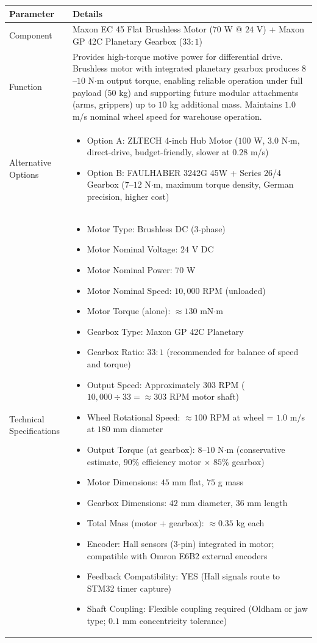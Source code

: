 \documentclass[12pt,a4paper]{article}
\begin{document}
\begin{longtable}{|p{4cm}|p{10cm}|}
\hline
\textbf{Parameter} & \textbf{Details} \\
\hline

Component &
Maxon EC 45 Flat Brushless Motor ($70$ W @ $24$ V) + Maxon GP 42C Planetary Gearbox ($33:1$) \\
\hline

Function &
Provides high-torque motive power for differential drive. Brushless motor with integrated planetary gearbox produces $8$--$10$ N$\cdot$m output torque, enabling reliable operation under full payload ($50$ kg) and supporting future modular attachments (arms, grippers) up to $10$ kg additional mass. Maintains $1.0$ m/s nominal wheel speed for warehouse operation. \\
\hline

Alternative Options &
\begin{itemize}
\item Option A: ZLTECH 4-inch Hub Motor ($100$ W, $3.0$ N$\cdot$m, direct-drive, budget-friendly, slower at $0.28$ m/s)
\item Option B: FAULHABER 3242G 45W + Series 26/4 Gearbox ($7$--$12$ N$\cdot$m, maximum torque density, German precision, higher cost)
\end{itemize}
\\
\hline

Technical Specifications &
\begin{itemize}
\item Motor Type: Brushless DC ($3$-phase)
\item Motor Nominal Voltage: $24$ V DC
\item Motor Nominal Power: $70$ W
\item Motor Nominal Speed: $10,000$ RPM (unloaded)
\item Motor Torque (alone): $\approx 130$ mN$\cdot$m
\item Gearbox Type: Maxon GP 42C Planetary
\item Gearbox Ratio: $33:1$ (recommended for balance of speed and torque)
\item Output Speed: Approximately $303$ RPM ($10,000 \div 33 = \approx 303$ RPM motor shaft)
\item Wheel Rotational Speed: $\approx 100$ RPM at wheel = $1.0$ m/s at $180$ mm diameter
\item Output Torque (at gearbox): $8$--$10$ N$\cdot$m (conservative estimate, $90\%$ efficiency motor $\times$ $85\%$ gearbox)
\item Motor Dimensions: $45$ mm flat, $75$ g mass
\item Gearbox Dimensions: $42$ mm diameter, $36$ mm length
\item Total Mass (motor + gearbox): $\approx 0.35$ kg each
\item Encoder: Hall sensors ($3$-pin) integrated in motor; compatible with Omron E6B2 external encoders
\item Feedback Compatibility: YES (Hall signals route to STM32 timer capture)
\item Shaft Coupling: Flexible coupling required (Oldham or jaw type; $0.1$ mm concentricity tolerance)


\end{itemize}
\end{longtable}
\end{document}
